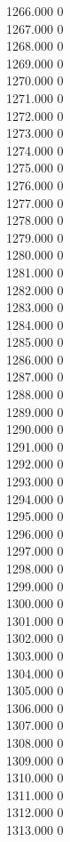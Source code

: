 { 1266.000	0 \\
 1267.000	0 \\
 1268.000	0 \\
 1269.000	0 \\
 1270.000	0 \\
 1271.000	0 \\
 1272.000	0 \\
 1273.000	0 \\
 1274.000	0 \\
 1275.000	0 \\
 1276.000	0 \\
 1277.000	0 \\
 1278.000	0 \\
 1279.000	0 \\
 1280.000	0 \\
 1281.000	0 \\
 1282.000	0 \\
 1283.000	0 \\
 1284.000	0 \\
 1285.000	0 \\
 1286.000	0 \\
 1287.000	0 \\
 1288.000	0 \\
 1289.000	0 \\
 1290.000	0 \\
 1291.000	0 \\
 1292.000	0 \\
 1293.000	0 \\
 1294.000	0 \\
 1295.000	0 \\
 1296.000	0 \\
 1297.000	0 \\
 1298.000	0 \\
 1299.000	0 \\
 1300.000	0 \\
 1301.000	0 \\
 1302.000	0 \\
 1303.000	0 \\
 1304.000	0 \\
 1305.000	0 \\
 1306.000	0 \\
 1307.000	0 \\
 1308.000	0 \\
 1309.000	0 \\
 1310.000	0 \\
 1311.000	0 \\
 1312.000	0 \\
 1313.000	0 \\
}
